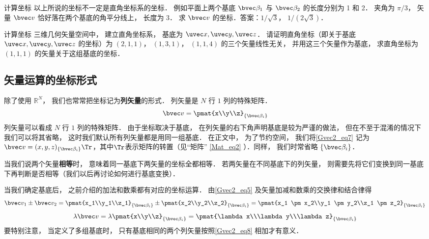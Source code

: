 \begin{exercise}{计算坐标}
以上所说的坐标不一定是直角坐标系的坐标． 例如平面上两个基底 $\bvec \beta_1$ 与 $\bvec \beta_2$ 的长度分别为 1 和 2． 夹角为 $\pi/3$， 矢量 $\bvec v$ 恰好落在两个基底的角平分线上， 长度为 3． 求 $\bvec v$ 的坐标．答案：$1/\sqrt 3$， $1/(2\sqrt 3)$．
\end{exercise}

\begin{exercise}{计算坐标}
三维几何矢量空间中， 建立直角坐标系， 基底为 $\uvec x, \uvec y, \uvec z$． 请证明直角坐标（即关于基底 $\uvec x, \uvec y, \uvec z$ 的坐标）为 $(2, 1, 1)$， $(1, 3, 1)$， $(1, 1, 4)$ 的三个矢量线性无关， 并用这三个矢量作为基底， 求直角坐标为 $(1, 1, 1)$ 的矢量关于这组基底的坐标．
\end{exercise}

\subsection{矢量运算的坐标形式}
除了使用 $\mathbb R^N$， 我们也常常把坐标记为\textbf{列矢量}的形式． 列矢量是 $N$ 行 $1$ 列的特殊矩阵．
\begin{equation}\label{Gvec2_eq7}
\bvec v = \pmat{x\\y\\z}_{\{\bvec\beta_i\}}
\end{equation}
列矢量可以看成 $N$ 行 $1$ 列的特殊矩阵． 由于坐标取决于基底， 在列矢量的右下角声明基底是较为严谨的做法， 但在不至于混淆的情况下我们可以将其省略， 这时我们默认所有列矢量都是用同一组基底． 在正文中， 为了节约空间， 我们将\autoref{Gvec2_eq7} 记为 $\bvec v = (x, y, z)_{\{\bvec\beta_i\}}\Tr$，其中$\Tr$表示矩阵的转置（见“矩阵” \autoref{Mat_eq2} ）．同样， 我们时常省略 $\{\bvec\beta_i\}$．

当我们说两个矢量\textbf{相等}时， 意味着同一基底下两矢量的坐标全都相等． 若两矢量在不同基底下的列矢量， 则需要先将它们变换到同一基底下再判断是否相等（我们以后再讨论如何进行基底变换）．

当我们确定基底后， 之前介绍的加法和数乘都有对应的坐标运算． 由\autoref{Gvec2_eq5} 及矢量加减和数乘的交换律和结合律得
\begin{equation}\label{Gvec2_eq8}
\bvec v_1 \pm \bvec v_2 = \pmat{x_1\\y_1\\z_1}_{\{\bvec\beta_i\}} \pm \pmat{x_2\\y_2\\z_2}_{\{\bvec\beta_i\}} = \pmat{x_1 \pm x_2\\y_1 \pm y_2\\z_1 \pm z_2}_{\{\bvec\beta_i\}}
\end{equation}
\begin{equation}\label{Gvec2_eq9}
\lambda \bvec v = \lambda\pmat{x\\y\\z}_{\{\bvec\beta_i\}} = \pmat{\lambda x\\\lambda y\\\lambda z}_{\{\bvec\beta_i\}}
\end{equation}
要特别注意， 当定义了多组基底时， 只有基底相同的两个列矢量按照\autoref{Gvec2_eq8} 相加才有意义．
